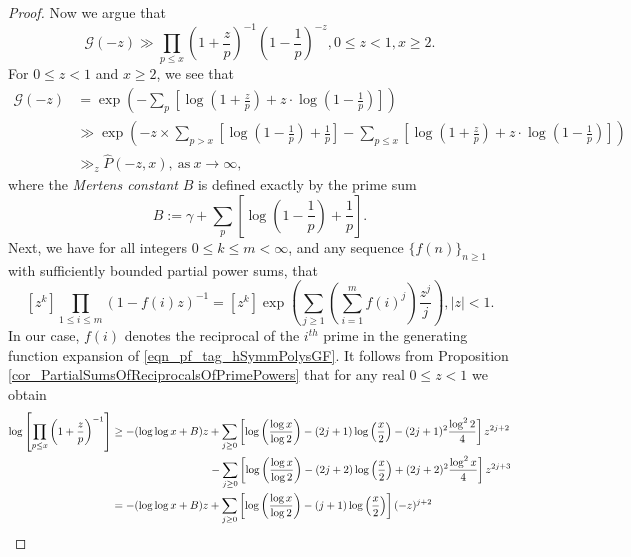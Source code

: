 \documentclass[11pt,reqno,a4letter]{article}
\numberwithin{figure}{section}
\numberwithin{table}{section}
\theoremstyle{plain}
\numberwithin{theorem}{section}
\theoremstyle{definition}
\begin{document}
\begin{proof}
Now we argue that 
\[
\mathcal{G}(-z) \gg \prod_{p \leq x} \left(1 + \frac{z}{p}\right)^{-1} 
     \left(1 - \frac{1}{p}\right)^{-z}, 0 \leq z < 1, x \geq 2. 
\]
For $0 \leq z < 1$ and $x \geq 2$, we see that 
\begin{align*} 
\mathcal{G}(-z) & = \exp\left(-\sum_p \left[\log\left(1 + \frac{z}{p}\right) + 
     z \cdot \log\left(1 - \frac{1}{p}\right)\right]\right) \\ 
     & \gg 
     \exp\left(-z \times \sum_{p > x} \left[
     \log\left(1 - \frac{1}{p}\right) + \frac{1}{p}\right] - 
     \sum_{p \leq x} \left[\log\left(1 + \frac{z}{p}\right) + 
     z \cdot \log\left(1 - \frac{1}{p}\right)\right]\right) \\ 
     & \gg_z \widehat{P}(-z, x), \mathrm{\ as\ } x \rightarrow \infty, 
\end{align*} 
where the \emph{Mertens constant} $B$ is defined exactly by the prime sum 
\cite[\S 22.8]{HARDYWRIGHT} 
\[
B := \gamma + \sum_p \left[\log\left(1-\frac{1}{p}\right) + \frac{1}{p}\right]. 
\]
Next, we have for all integers $0 \leq k \leq m < \infty$, and any sequence 
$\{f(n)\}_{n \geq 1}$ with sufficiently bounded partial power sums, that 
\cite[\S 2]{MACDONALD-SYMFUNCS} 
\begin{equation} 
\label{eqn_pf_tag_hSymmPolysGF} 
[z^k] \prod_{1 \leq i \leq m} (1-f(i) z)^{-1} = [z^k] \exp\left(\sum_{j \geq 1} 
     \left(\sum_{i=1}^m f(i)^j\right) \frac{z^j}{j}\right), |z| < 1. 
\end{equation} 
In our case, $f(i)$ denotes the reciprocal of the 
$i^{th}$ prime in the generating function expansion of 
\eqref{eqn_pf_tag_hSymmPolysGF}. 
It follows from Proposition \ref{cor_PartialSumsOfReciprocalsOfPrimePowers} that 
for any real $0 \leq z < 1$ we obtain 
\begin{align} 
\notag 
\log\left[\prod_{p \leq x} \left(1+\frac{z}{p}\right)^{-1}\right] & \geq -(\log\log x + B) z + 
     \sum_{j \geq 0} \left[\log\left(\frac{\log x}{\log 2}\right) - 
     (2j+1) \log\left(\frac{x}{2}\right) - (2j+1)^2 \frac{\log^2 2}{4}\right] z^{2j+2} \\ 
\notag 
     & \phantom{\geq -(\log\log x + B) z\ } - 
     \sum_{j \geq 0} \left[\log\left(\frac{\log x}{\log 2}\right) - 
     (2j+2) \log\left(\frac{x}{2}\right) + (2j+2)^2 \frac{\log^2 x}{4}\right] z^{2j+3} \\ 
\notag 
     & = -(\log\log x + B) z + \sum_{j \geq 0} \left[ 
     \log\left(\frac{\log x}{\log 2}\right) - 
     (j+1) \log\left(\frac{x}{2}\right)\right] (-z)^{j+2} \\ 

\end{align}
\end{proof}
\end{document}
